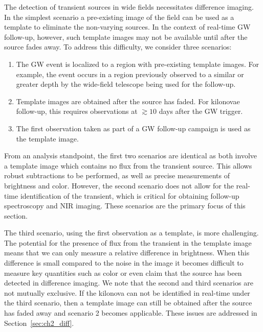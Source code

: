 The detection of transient sources in wide fields necessitates difference imaging. In the simplest scenario a pre-existing image of the field can be used as a template to eliminate the non-varying sources. In the context of real-time GW follow-up, however, such template images may not be available until after the source fades away. To address this difficulty, we consider three scenarios:
\begin{enumerate}
\item The GW event is localized to a region with pre-existing template images. For example, the event occurs in a region previously observed to a similar or greater depth by the wide-field telescope being used for the follow-up.
\item Template images are obtained after the source has faded. For kilonovae follow-up, this requires observations at $\gtrsim10$ days after the GW trigger.
\item The first observation taken as part of a GW follow-up campaign is used as the template image.
\end{enumerate}

From an analysis standpoint, the first two scenarios are identical as both involve a template image which contains no flux from the transient source. This allows robust subtractions to be performed, as well as precise measurements of brightness and color. However, the second scenario does not allow for the real-time identification of the transient, which is critical for obtaining follow-up spectroscopy and NIR imaging. These scenarios are the primary focus of this section.

The third scenario, using the first observation as a template, is more challenging. The potential for the presence of flux from the transient in the template image means that we can only measure a relative difference in brightness. When this difference is small compared to the noise in the image it becomes difficult to measure key quantities such as color or even claim that the source has been detected in difference imaging. We note that the second and third scenarios are not mutually exclusive. If the kilonova can not be identified in real-time under the third scenario, then a template image can still be obtained after the source has faded away and scenario 2 becomes applicable. These issues are addressed in Section~\ref{sec:ch2_diff}.

